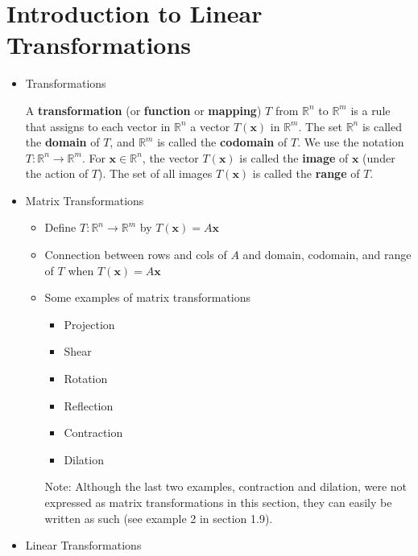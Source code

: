 \documentclass[10pt]{book}
\newenvironment{boxdef}{\begin{mdframed}[backgroundcolor=gray!30,linewidth=0pt,nobreak=true]}{\end{mdframed}}
\newcommand{\R}{\mathbb{R}}
\newcommand{\vect}[1]{\ensuremath{\boldsymbol{\mathbf{#1}}}}
\newcommand{\Ax}{A\vect{x}}
\begin{document}
\newpage


\section{Introduction to Linear Transformations}
\begin{itemize}
	\item Transformations
		\begin{boxdef}
			A \textbf{transformation} (or \textbf{function} or \textbf{mapping}) $T$ from $\R^n$ to $\R^m$ is a rule that assigns to each vector in $\R^n$ a vector $T(\vect{x})$ in $\R^m$. The set $\R^n$ is called the \textbf{domain} of $T$, and $\R^m$ is called the \textbf{codomain} of $T$. We use the notation $T:\R^n\to\R^m$. For $\vect{x}\in\R^n$, the vector $T(\vect{x})$ is called the \textbf{image} of $\vect{x}$ (under the action of $T$). The set of all images $T(\vect{x})$ is called the \textbf{range} of $T$.
		\end{boxdef}
	\item Matrix Transformations
		\begin{itemize}
			\item Define $T:\R^n\to\R^m$ by $T(\vect{x})=\Ax$
			\item Connection between rows and cols of $A$ and domain, codomain, and range of $T$ when $T(\vect{x})=\Ax$
			\item Some examples of matrix transformations
				\begin{itemize}
					\item Projection
					\item Shear
					\item Rotation
					\item Reflection
					\item Contraction
					\item Dilation
				\end{itemize}
				Note: Although the last two examples, contraction and dilation, were not expressed as matrix transformations in this section, they can easily be written as such (see example 2 in section 1.9).
		\end{itemize}
	\item Linear Transformations

\end{itemize}
\end{document}
